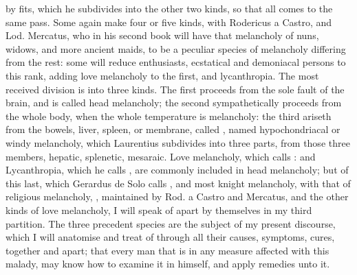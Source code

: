 by fits, which he subdivides into the other two kinds, so that all comes to the
same pass. Some again make four or five kinds, with Rodericus a Castro,
 and Lod. Mercatus, who
in his second book  will have
that melancholy of nuns, widows, and more ancient maids, to be a peculiar
species of melancholy differing from the rest: some will reduce enthusiasts,
ecstatical and demoniacal persons to this rank, adding
love melancholy to the first, and lycanthropia. The most
received division is into three kinds. The first proceeds from the sole fault
of the brain, and is called head melancholy; the second sympathetically
proceeds from the whole body, when the whole temperature is melancholy: the
third ariseth from the bowels, liver, spleen, or membrane, called
, named hypochondriacal or windy melancholy, which
Laurentius subdivides into three parts, from those three
members, hepatic, splenetic, mesaraic. Love melancholy, which \Avicenna{} calls
: and Lycanthropia, which he calls , are commonly
included in head melancholy; but of this last, which Gerardus de Solo calls
, and most knight melancholy, with that of religious melancholy,
, maintained by Rod. a Castro and Mercatus, and the
other kinds of love melancholy, I will speak of apart by themselves in my third
partition. The three precedent species are the subject of my present discourse,
which I will anatomise and treat of through all their causes, symptoms, cures,
together and apart; that every man that is in any measure affected with this
malady, may know how to examine it in himself, and apply remedies unto it.

